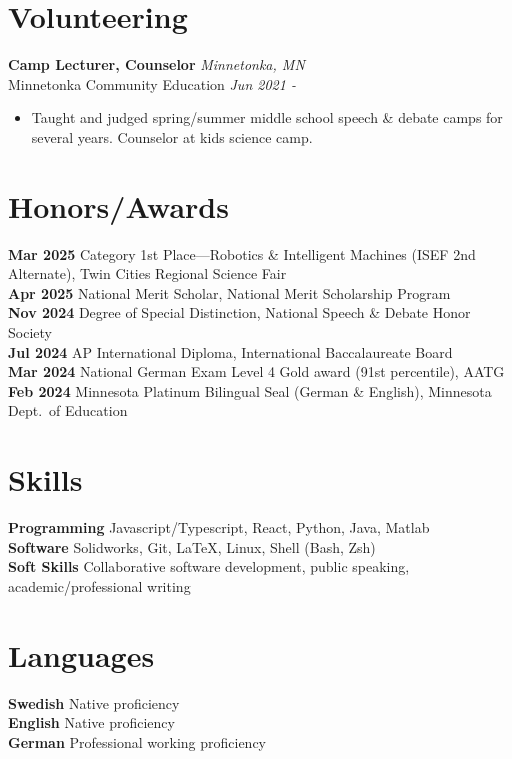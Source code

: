 \documentclass{article}
\begin{document}
\section{Volunteering}

\textbf{Camp Lecturer, Counselor} \hfill \textit{Minnetonka, MN}\\
Minnetonka Community Education \hfill \textit{Jun 2021 -}
\begin{itemize}
\item Taught and judged spring/summer middle school speech \& debate camps for several years. Counselor at kids science camp.
\end{itemize}

\section{Honors/Awards}

\textbf{Mar 2025} Category 1st Place---Robotics \& Intelligent Machines (ISEF 2nd Alternate), Twin Cities Regional Science Fair\\
\textbf{Apr 2025} National Merit Scholar, National Merit Scholarship Program\\
\textbf{Nov 2024} Degree of Special Distinction, National Speech \& Debate Honor Society\\
\textbf{Jul 2024} AP International Diploma, International Baccalaureate Board\\
\textbf{Mar 2024} National German Exam Level 4 Gold award (91st percentile), AATG\\
\textbf{Feb 2024} Minnesota Platinum Bilingual Seal (German \& English), Minnesota Dept.\ of Education

\section{Skills}

\textbf{Programming} Javascript/Typescript, React, Python, Java, Matlab\\
\textbf{Software} Solidworks, Git, \LaTeX, Linux, Shell (Bash, Zsh)\\
\textbf{Soft Skills} Collaborative software development, public speaking, academic/professional writing

\section{Languages}

\textbf{Swedish} Native proficiency\\
\textbf{English} Native proficiency\\
\textbf{German} Professional working proficiency
\end{document}

